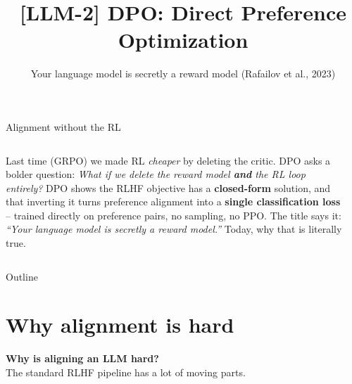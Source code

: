 \documentclass[aspectratio=169]{beamer}
\title{[LLM-2] DPO: Direct Preference Optimization}
\subtitle{Your language model is secretly a reward model (Rafailov et al., 2023)}
\date{}
\begin{document}
\begin{frame}{Alignment without the RL}
  \begin{columns}[T]
    Last time (GRPO) we made RL \emph{cheaper} by deleting the critic. DPO asks a bolder
    question:
    \vskip 6pt
    \emph{What if we delete the reward model \textbf{and} the RL loop entirely?}
    \vskip 8pt
    DPO shows the RLHF objective has a \textbf{closed-form} solution, and that inverting it
    turns preference alignment into a \textbf{single classification loss} -- trained
    directly on preference pairs, no sampling, no PPO.
    \vskip 8pt
    The title says it: \emph{``Your language model is secretly a reward model.''} Today,
    why that is literally true.
    \begin{center}
    \end{center}
  \end{columns}
\end{frame}

\begin{frame}{Outline}
  \tableofcontents
\end{frame}

\section{Why alignment is hard}

\begin{frame}[plain]
  \vfill
  \begin{center}
    {\color{popblue}\Large\bfseries Why is aligning an LLM hard?}\\[4pt]
    \small The standard RLHF pipeline has a lot of moving parts.
  \end{center}
  \vfill
\end{frame}
\end{document}
